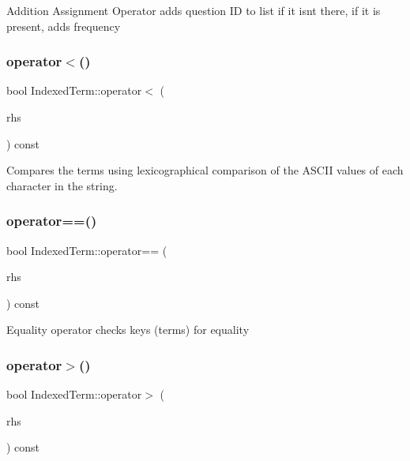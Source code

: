 Addition Assignment Operator adds question ID to list if it isn\textquotesingle{}t there, if it is present, adds frequency \mbox{\label{classIndexedTerm_aab009480a31b3f9ab1e1d712cf9f8298}} 
\subsubsection{\texorpdfstring{operator$<$()}{operator<()}}
{\footnotesize\ttfamily bool Indexed\+Term\+::operator$<$ (\begin{DoxyParamCaption}\item[{const \mbox{\hyperlink{classIndexedTerm}{Indexed\+Term}} \&}]{rhs }\end{DoxyParamCaption}) const}

Compares the terms using lexicographical comparison of the A\+S\+C\+II values of each character in the string. \mbox{\label{classIndexedTerm_ae8a7856cb7afd5b7029df2a47bf3c378}} 
\subsubsection{\texorpdfstring{operator==()}{operator==()}}
{\footnotesize\ttfamily bool Indexed\+Term\+::operator== (\begin{DoxyParamCaption}\item[{const \mbox{\hyperlink{classIndexedTerm}{Indexed\+Term}} \&}]{rhs }\end{DoxyParamCaption}) const}

Equality operator checks keys (terms) for equality \mbox{\label{classIndexedTerm_a770d1caf59facdb5694493aa57123abb}} 
\subsubsection{\texorpdfstring{operator$>$()}{operator>()}}
{\footnotesize\ttfamily bool Indexed\+Term\+::operator$>$ (\begin{DoxyParamCaption}\item[{const \mbox{\hyperlink{classIndexedTerm}{Indexed\+Term}} \&}]{rhs }\end{DoxyParamCaption}) const}

